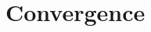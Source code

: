 \documentclass[journal,12pt,twocolumn]{IEEEtran}
\begin{document}
% 



\maketitle
\section{Convergence}
\end{document}
